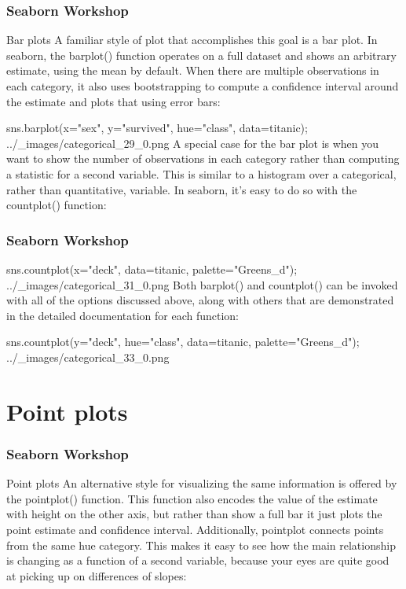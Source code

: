 \begin{frame}[fragile]
\frametitle{Seaborn Workshop}
\large

Bar plots
A familiar style of plot that accomplishes this goal is a bar plot. In seaborn, the barplot() function operates on a full dataset and shows an arbitrary estimate, using the mean by default. When there are multiple observations in each category, it also uses bootstrapping to compute a confidence interval around the estimate and plots that using error bars:

sns.barplot(x="sex", y="survived", hue="class", data=titanic);
../_images/categorical_29_0.png
A special case for the bar plot is when you want to show the number of observations in each category rather than computing a statistic for a second variable. This is similar to a histogram over a categorical, rather than quantitative, variable. In seaborn, it’s easy to do so with the countplot() function:
\end{frame}
\begin{frame}[fragile]
	\frametitle{Seaborn Workshop}
	
sns.countplot(x="deck", data=titanic, palette="Greens_d");
../_images/categorical_31_0.png
Both barplot() and countplot() can be invoked with all of the options discussed above, along with others that are demonstrated in the detailed documentation for each function:

sns.countplot(y="deck", hue="class", data=titanic, palette="Greens_d");
../_images/categorical_33_0.png
\end{frame}
\section{Point plots}
\begin{frame}[fragile]
	\frametitle{Seaborn Workshop}
Point plots
An alternative style for visualizing the same information is offered by the pointplot() function. This function also encodes the value of the estimate with height on the other axis, but rather than show a full bar it just plots the point estimate and confidence interval. Additionally, pointplot connects points from the same hue category. This makes it easy to see how the main relationship is changing as a function of a second variable, because your eyes are quite good at picking up on differences of slopes:
\end{frame}

